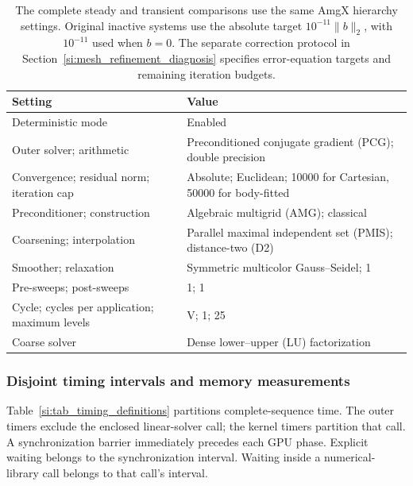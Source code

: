 \begin{table}[pos=htbp]
\centering\small
\caption{The complete steady and transient comparisons use the
same AmgX hierarchy settings. Original inactive systems use the absolute
target $10^{-11}\|b\|_2$, with $10^{-11}$ used when $b=0$.
The separate correction protocol in Section~\ref{si:mesh_refinement_diagnosis}
specifies error-equation targets and remaining iteration budgets.}
\label{si:tab_amgx_configuration}
\begin{tabularx}{\textwidth}{@{}lX@{}}
\toprule
Setting & Value \\
\midrule
Deterministic mode & Enabled \\
Outer solver; arithmetic & Preconditioned conjugate gradient (PCG); double precision \\
Convergence; residual norm; iteration cap &
Absolute; Euclidean; 10000 for Cartesian, 50000 for body-fitted \\
Preconditioner; construction & Algebraic multigrid (AMG); classical \\
Coarsening; interpolation & Parallel maximal independent set (PMIS); distance-two (D2) \\
Smoother; relaxation & Symmetric multicolor Gauss--Seidel; 1 \\
Pre-sweeps; post-sweeps & 1; 1 \\
Cycle; cycles per application; maximum levels & V; 1; 25 \\
Coarse solver & Dense lower--upper (LU) factorization \\
\bottomrule
\end{tabularx}
\end{table}

\subsubsection{Disjoint timing intervals and memory measurements}
\label{si:cht_timing}
Table~\ref{si:tab_timing_definitions} partitions complete-sequence
time.
The outer timers exclude the enclosed linear-solver call; the
kernel timers partition that call. A synchronization barrier
immediately precedes each GPU phase. Explicit waiting belongs to
the synchronization interval. Waiting inside a numerical-library
call belongs to that call's interval.

